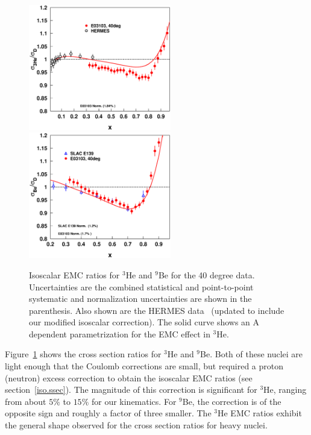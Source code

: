 \begin{figure}[htbp]
\begin{center}
\includegraphics[width=.44\textwidth,height=55mm]{plots/slacWithallcorr_e03103_40deg_emc_x_he3.eps}
\includegraphics[width=.44\textwidth,height=55mm]{plots/slacWithallcorr_e03103_40deg_emc_x_be.eps}
\caption{Isoscalar EMC ratios for $^3$He and $^9$Be for the 40 degree data.
Uncertainties are the combined statistical and point-to-point systematic and
normalization uncertainties are shown in the parenthesis. Also shown are the
HERMES data~\cite{hermes_ackerstaff,hermes_correction_airapetian} (updated to
include our modified isoscalar correction). The solid curve shows an A
dependent parametrization for the EMC effect in $^3$He.
\label{emc_x_40deg_he3_fig}}
\end{center}
\end{figure}


Figure~\ref{emc_x_40deg_he3_fig} shows the cross section ratios for $^3$He
and $^9$Be.  Both of these nuclei are light enough that the Coulomb corrections
are small, but required a proton (neutron) excess correction to obtain the
isoscalar EMC ratios (see section~\ref{iso.ssec}). The magnitude of this
correction is significant for $^3$He, ranging from about $5\%$ to $15\%$ for
our kinematics.  For $^9$Be, the correction is of the opposite sign and
roughly a factor of three smaller.  The $^3$He EMC ratios exhibit the general
shape observed for the cross section ratios for heavy nuclei.

